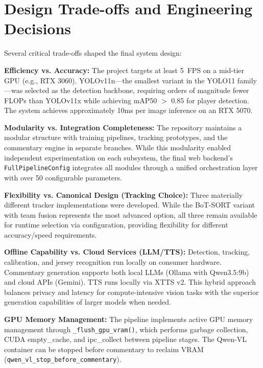 \documentclass[10pt,twocolumn,a4paper]{article}
\begin{document}
\section{Design Trade-offs and Engineering Decisions}

Several critical trade-offs shaped the final system design:

\textbf{Efficiency vs. Accuracy:} The project targets at least 5~FPS on a mid-tier GPU (e.g., RTX 3060). YOLOv11n---the smallest variant in the YOLO11 family---was selected as the detection backbone, requiring orders of magnitude fewer FLOPs than YOLOv11x while achieving mAP50 $>$ 0.85 for player detection. The system achieves approximately 10ms per image inference on an RTX 5070.

\textbf{Modularity vs. Integration Completeness:} The repository maintains a modular structure with training pipelines, tracking prototypes, and the commentary engine in separate branches. While this modularity enabled independent experimentation on each subsystem, the final web backend's \texttt{FullPipelineConfig} integrates all modules through a unified orchestration layer with over 50 configurable parameters.

\textbf{Flexibility vs. Canonical Design (Tracking Choice):} Three materially different tracker implementations were developed. While the BoT-SORT variant with team fusion represents the most advanced option, all three remain available for runtime selection via configuration, providing flexibility for different accuracy/speed requirements.

\textbf{Offline Capability vs. Cloud Services (LLM/TTS):} Detection, tracking, calibration, and jersey recognition run locally on consumer hardware. Commentary generation supports both local LLMs (Ollama with Qwen3.5:9b) and cloud APIs (Gemini). TTS runs locally via XTTS v2. This hybrid approach balances privacy and latency for compute-intensive vision tasks with the superior generation capabilities of larger models when needed.

\textbf{GPU Memory Management:} The pipeline implements active GPU memory management through \texttt{\_flush\_gpu\_vram()}, which performs garbage collection, CUDA empty\_cache, and ipc\_collect between pipeline stages. The Qwen-VL container can be stopped before commentary to reclaim VRAM (\texttt{qwen\_vl\_stop\_before\_commentary}).

\end{document}
